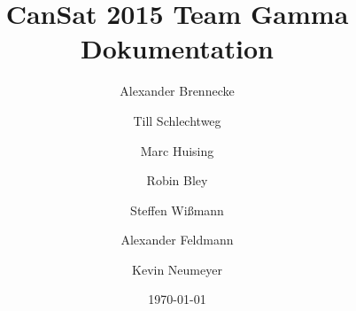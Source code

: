 \documentclass[11pt]{scrartcl}
\begin{document}
\title{CanSat 2015 Team Gamma Dokumentation}
\date{\today}
\author{Alexander Brennecke \and Till Schlechtweg \and Marc Huising \and Robin Bley \and Steffen Wißmann \and Alexander Feldmann \and Kevin Neumeyer}
\maketitle

\newpage

\tableofcontents

\newpage


\newpage


\newpage


\newpage


\newpage

\end{document}
